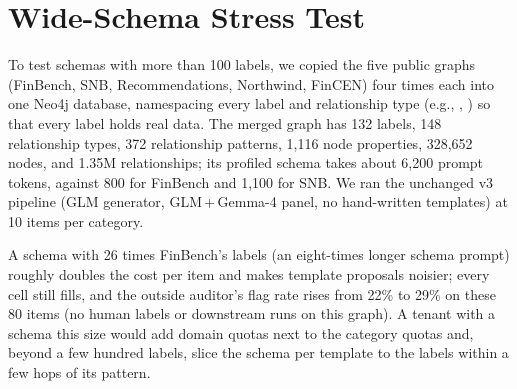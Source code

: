 \section{Wide-Schema Stress Test}
\label{app:wide}
To test schemas with more than 100 labels, we copied the five public graphs (FinBench, SNB, Recommendations, Northwind, FinCEN) four times each into one Neo4j database, namespacing every label and relationship type (e.g., , ) so that every label holds real data. The merged graph has 132 labels, 148 relationship types, 372 relationship patterns, 1,116 node properties, 328,652 nodes, and 1.35M relationships; its profiled schema takes about 6,200 prompt tokens, against 800 for FinBench and 1,100 for SNB. We ran the unchanged v3 pipeline (GLM generator, GLM\,+\,Gemma-4 panel, no hand-written templates) at 10 items per category.

\begin{table}[H]
\centering
\footnotesize
{}
\caption{The pipeline on a 132-label schema. $^\ast$Eight main-build cells were stopped at a time budget (Appendix~\ref{app:judges}). Template rejections on the wide schema are mostly properties attached to the wrong label (32 of 36), which the schema check catches. Accepted items span all five domains but unevenly (Recommendations 34, FinCEN 26, Northwind 11, FinBench 8, SNB 1), because the planner balances categories and ignores domains.}
\label{tab:wide}
\end{table}

A schema with 26 times FinBench's labels (an eight-times longer schema prompt) roughly doubles the cost per item and makes template proposals noisier; every cell still fills, and the outside auditor's flag rate rises from 22\% to 29\% on these 80 items (no human labels or downstream runs on this graph). A tenant with a schema this size would add domain quotas next to the category quotas and, beyond a few hundred labels, slice the schema per template to the labels within a few hops of its pattern.
